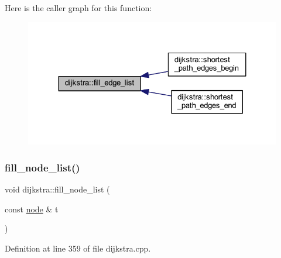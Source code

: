 Here is the caller graph for this function\+:\nopagebreak
\begin{figure}[H]
\begin{center}
\leavevmode
\includegraphics[width=324pt]{classdijkstra_ab2dfb6e0c2b9084fa17e2e6349e20ad9_icgraph}
\end{center}
\end{figure}
\mbox{\label{classdijkstra_a71ad317c485ce76d3d22399f1a8c83fe}} 
\subsubsection{\texorpdfstring{fill\+\_\+node\+\_\+list()}{fill\_node\_list()}}
{\footnotesize\ttfamily void dijkstra\+::fill\+\_\+node\+\_\+list (\begin{DoxyParamCaption}\item[{const \mbox{\hyperlink{classnode}{node}} \&}]{t }\end{DoxyParamCaption})\hspace{0.3cm}{\ttfamily [private]}}



Definition at line 359 of file dijkstra.\+cpp.


